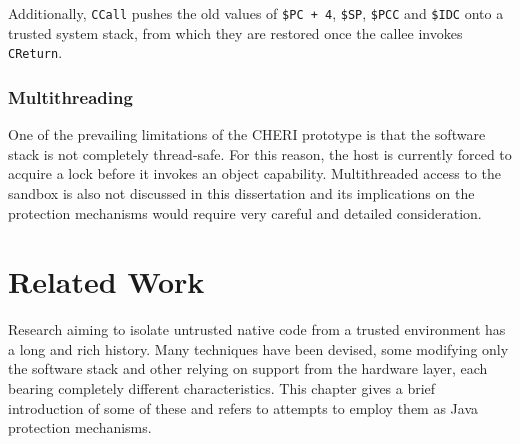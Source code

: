 \documentclass[a4paper,12pt,twoside,openright]{report}
\newcommand{\reg}[1]{\texttt{\$#1}}
\newcommand{\insn}[1]{\texttt{#1}}
\begin{document}
Additionally, \insn{CCall} pushes the old values of \texttt{\reg{PC}~+~4}, \reg{SP}, \reg{PCC} and \reg{IDC} onto a trusted system stack, from which they are restored once the callee invokes \insn{CReturn}.

\subsection{Multithreading}

One of the prevailing limitations of the CHERI prototype is that the software stack is not completely thread-safe. For this reason, the host is currently forced to acquire a lock before it invokes an object capability. Multithreaded access to the sandbox is also not discussed in this dissertation and its implications on the protection mechanisms would require very careful and detailed consideration.

\chapter{Related Work} 

% 
% 

Research aiming to isolate untrusted native code from a trusted environment has a long and rich history. Many techniques have been devised, some modifying only the software stack and other relying on support from the hardware layer, each bearing completely different characteristics. This chapter gives a brief introduction of some of these and refers to attempts to employ them as Java protection mechanisms.
\end{document}

